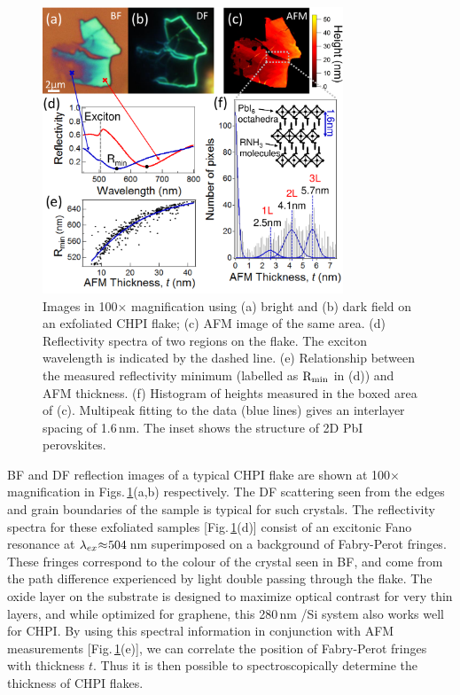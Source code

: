 \begin{figure}[ht]
\centering
\includegraphics[width=0.8\textwidth]{Fig3}
\caption[Microscopy, spectroscopy and AFM measurements on exfoliated CHPI flakes.]{Images in 100$\times$ magnification using (a) bright and (b) dark field on an exfoliated CHPI flake; (c) AFM image of the same area. (d) Reflectivity spectra of two regions on the flake. The exciton wavelength is indicated by the dashed line. (e) Relationship between the measured reflectivity minimum (labelled as $\textnormal{R}_\textnormal{min}$ in (d)) and AFM thickness. (f) Histogram of heights measured in the boxed area of (c). Multipeak fitting to the data (blue lines) gives an interlayer spacing of 1.6\,nm. The inset shows the structure of 2D PbI perovskites.}
\label{5Fig3}
\end{figure}

BF and DF reflection images of a typical CHPI flake are shown at 100$\times$ magnification in Figs.\,\ref{5Fig3}(a,b) respectively. The DF scattering seen from the edges and grain boundaries of the sample is typical for such crystals. The reflectivity spectra for these exfoliated samples [Fig.\,\ref{5Fig3}(d)] consist of an excitonic Fano resonance at $\lambda_{ex}\negmedspace\approx\negmedspace504$\,nm superimposed on a background of Fabry-Perot fringes. These fringes correspond to the colour of the crystal seen in BF, and come from the path difference experienced by light double passing through the flake. The oxide layer on the substrate is designed to maximize optical contrast for very thin layers, and while optimized for graphene, this 280\,nm /Si system also works well for CHPI. By using this spectral information in conjunction with AFM measurements [Fig.\,\ref{5Fig3}(e)], we can correlate the position of Fabry-Perot fringes with thickness $t$. Thus it is then possible to spectroscopically determine the thickness of CHPI flakes.


